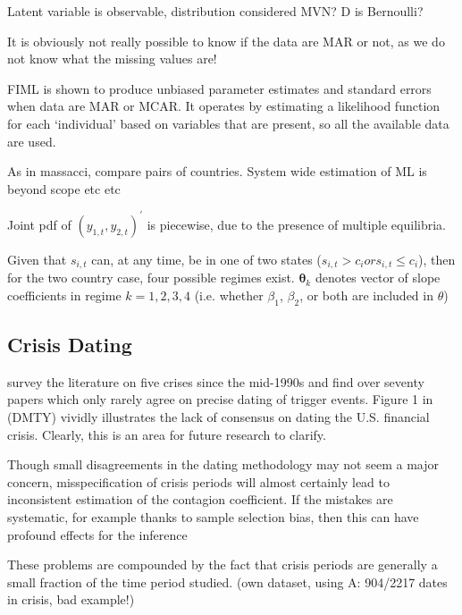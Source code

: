 \documentclass[../base.tex]{subfiles}
\begin{document}
Latent variable is observable, distribution considered MVN? D is Bernoulli?

It is obviously not really possible to know if the data are MAR or not, as we do not know what the missing values are! 

FIML is shown to produce unbiased parameter estimates and standard errors when data are MAR or MCAR. It operates by estimating a likelihood function for each `individual' based on variables that are present, so all the available data are used. 

As in massacci, compare pairs of countries. System wide estimation of ML is beyond scope etc etc

 Joint pdf of $(y_{1,t}, y_{2,t})^{\prime}$ is piecewise, due to the presence of multiple equilibria.


Given that $s_{i,t}$ can, at any time, be in one of two states ($s_{i,t} > c_i or s_{i,t} \leq c_i$), then for the two country case, four possible regimes exist. $\mathbf{\theta}_k$ denotes vector of slope coefficients in regime $k = 1, 2, 3, 4$ (i.e. whether $\beta_1$, $\beta_2$, or both are included in $\theta$)


\subsection{Crisis Dating}
\label{dating_methodology}

\cite{fry2011actually} survey the literature on five crises since the mid-1990s and find over seventy papers which only rarely agree on precise dating of trigger events. Figure 1 in  \cite{dungey2015endogenous} (DMTY) vividly illustrates the lack of consensus on dating the U.S. financial crisis. Clearly, this is an area for future research to clarify.

Though small disagreements in the dating methodology may not seem a major concern, misspecification of crisis periods will almost certainly lead to inconsistent estimation of the contagion coefficient. If the mistakes are systematic, for example thanks to sample selection bias, then this can have profound effects for the inference 

These problems are compounded by the fact that crisis periods are generally a small fraction of the time period studied. (own dataset, using A: 904/2217 dates in crisis, bad example!)
\end{document}
